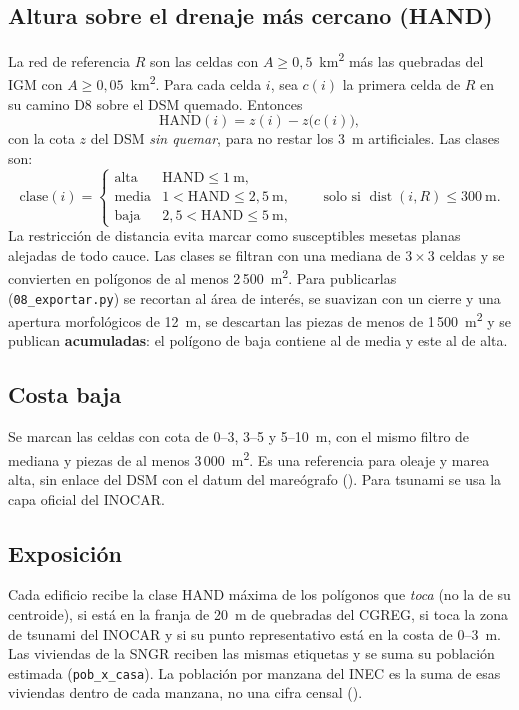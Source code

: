 \documentclass{sosg-informe}
\newcommand{\kmc}{km\textsuperscript{2}}
\newcommand{\mc}{m\textsuperscript{2}}
\begin{document}
\subsection{Altura sobre el drenaje más cercano (HAND)}
La red de referencia $R$ son las celdas con $A \geq 0{,}5$~\kmc{} más las quebradas del IGM con $A \geq 0{,}05$~\kmc. Para cada celda $i$, sea $c(i)$ la primera celda de $R$ en su camino D8 sobre el DSM quemado. Entonces \citep{renno2008,nobre2011}
\begin{equation}
  \mathrm{HAND}(i) = z(i) - z\bigl(c(i)\bigr),
\end{equation}
con la cota $z$ del DSM \emph{sin quemar}, para no restar los 3~m artificiales. Las clases son:
\begin{equation}
  \text{clase}(i) = \begin{cases}
    \text{alta} & \mathrm{HAND} \leq 1\ \text{m},\\
    \text{media} & 1 < \mathrm{HAND} \leq 2{,}5\ \text{m},\\
    \text{baja} & 2{,}5 < \mathrm{HAND} \leq 5\ \text{m},
  \end{cases}
  \qquad \text{solo si } \operatorname{dist}(i, R) \leq 300\ \text{m}.
\end{equation}
La restricción de distancia evita marcar como susceptibles mesetas planas alejadas de todo cauce. Las clases se filtran con una mediana de $3 \times 3$ celdas y se convierten en polígonos de al menos 2\,500~\mc. Para publicarlas (\texttt{08\_exportar.py}) se recortan al área de interés, se suavizan con un cierre y una apertura morfológicos de 12~m, se descartan las piezas de menos de 1\,500~\mc{} y se publican \textbf{acumuladas}: el polígono de baja contiene al de media y este al de alta.

\subsection{Costa baja}
Se marcan las celdas con cota de 0--3, 3--5 y 5--10~m, con el mismo filtro de mediana y piezas de al menos 3\,000~\mc. Es una referencia para oleaje y marea alta, sin enlace del DSM con el datum del mareógrafo (). Para tsunami se usa la capa oficial del INOCAR.

\subsection{Exposición}
Cada edificio recibe la clase HAND máxima de los polígonos que \emph{toca} (no la de su centroide), si está en la franja de 20~m de quebradas del CGREG, si toca la zona de tsunami del INOCAR y si su punto representativo está en la costa de 0--3~m. Las viviendas de la SNGR reciben las mismas etiquetas y se suma su población estimada (\texttt{pob\_x\_casa}). La población por manzana del INEC es la suma de esas viviendas dentro de cada manzana, no una cifra censal ().
\end{document}
